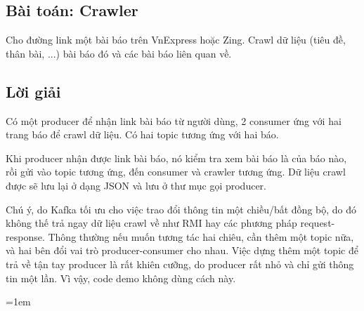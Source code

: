 \documentclass{article}
\begin{document}
\subsection{Bài toán: Crawler}

Cho đường link một bài báo trên VnExpress hoặc Zing. Crawl dữ liệu (tiêu đề,
thân bài, ...) bài báo đó và các bài báo liên quan về.

\subsection{Lời giải}

Có một producer để nhận link bài báo từ người dùng, 2 consumer ứng với hai trang
báo để crawl dữ liệu. Có hai topic tương ứng với hai báo.

Khi producer nhận được link bài báo, nó kiểm tra xem bài báo là của báo nào, rồi
gửi vào topic tương ứng, đến consumer và crawler tương ứng. Dữ liệu crawl được
sẽ lưu lại ở dạng JSON và lưu ở thư mục gọi producer.

Chú ý, do Kafka tối ưu cho việc trao đổi thông tin một chiều/bất đồng bộ, do đó
không thế trả ngay dữ liệu crawl về như RMI hay các phương pháp
request-response. Thông thường nếu muốn tương tác hai chiêu, cần thêm một topic
nữa, và hai bên đổi vai trò producer-consumer cho nhau. Việc dựng thêm một topic
để trả về tận tay producer là rất khiên cưỡng, do producer rất nhỏ và chỉ gửi
thông tin một lần. Vì vậy, code demo không dùng cách này.

\emergencystretch=1em
\printbibliography[title={Tài liệu tham khảo}]
\end{document}
